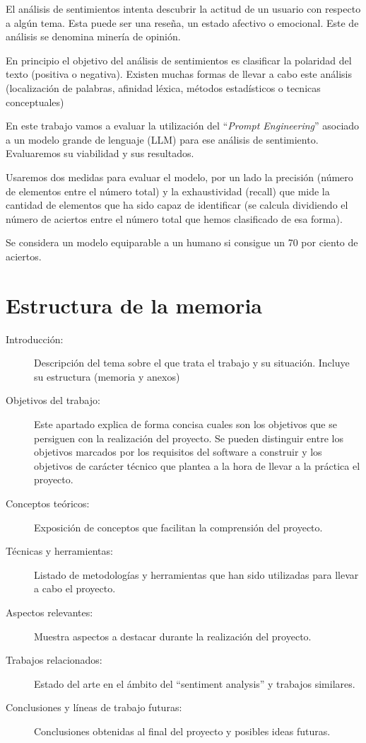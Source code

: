 
El análisis de sentimientos intenta descubrir la actitud de un usuario 
con respecto a algún tema.
Esta puede ser una reseña, un estado afectivo o emocional. 
Este de análisis se denomina minería de opinión.

En principio el objetivo del análisis de sentimientos es 
clasificar la polaridad del texto (positiva o negativa).
Existen muchas formas de llevar a cabo este análisis (localización de palabras, 
afinidad léxica, métodos estadísticos o tecnicas conceptuales)~\cite{Bannister2015}

En este trabajo vamos a evaluar la utilización del ``\emph{Prompt Engineering}'' 
asociado a un modelo grande de lenguaje (LLM) para ese análisis de sentimiento.
Evaluaremos su viabilidad y sus resultados. 

Usaremos dos medidas para evaluar el modelo, 
por un lado la precisión (número de elementos entre el número total) 
y la exhaustividad (recall) que mide la cantidad de elementos 
que ha sido capaz de identificar 
(se calcula dividiendo el número de aciertos entre el número 
total que hemos clasificado de esa forma). 

Se considera un modelo equiparable a un humano si consigue un 70 por ciento de aciertos.~\cite{Saif2013}

\section{Estructura de la memoria}
\begin{description}
	\item[Introducción:] Descripción del tema sobre el que trata el trabajo y su situación. 
    Incluye su estructura (memoria y anexos)
	\item[Objetivos del trabajo:] Este apartado explica de forma concisa cuales son los objetivos 
    que se persiguen con la realización del proyecto. 
    Se pueden distinguir entre los objetivos marcados por los requisitos del software a construir y
     los objetivos de carácter técnico que plantea a la hora de llevar a la práctica el proyecto.
    \item[Conceptos teóricos:] Exposición de conceptos que facilitan la comprensión del proyecto.
    \item[Técnicas y herramientas:] Listado de metodologías y herramientas que han sido 
    utilizadas para llevar a cabo el proyecto.
    \item[Aspectos relevantes:] Muestra aspectos a destacar durante la realización del proyecto.
    \item[Trabajos relacionados:] Estado del arte en el ámbito del ``sentiment analysis'' y trabajos similares.
    \item[Conclusiones y líneas de trabajo futuras:] Conclusiones obtenidas al final del proyecto y posibles ideas futuras.
\end{description}

